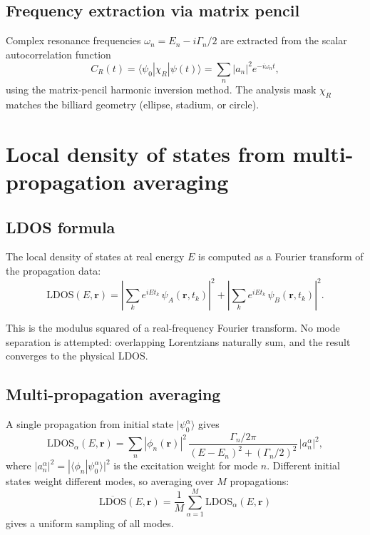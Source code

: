 \documentclass[11pt,a4paper]{article}
\newcommand{\vb}[1]{\mathbf{#1}}
\begin{document}
\subsection{Frequency extraction via matrix pencil}

Complex resonance frequencies $\omega_n = E_n - i\Gamma_n/2$ are extracted from
the scalar autocorrelation function
\begin{equation}
  C_R(t) = \langle\psi_0|\chi_R|\psi(t)\rangle
         = \sum_n |a_n|^2 e^{-i\omega_n t},
\end{equation}
using the matrix-pencil harmonic inversion method.  The analysis mask $\chi_R$
matches the billiard geometry (ellipse, stadium, or circle).

\section{Local density of states from multi-propagation averaging}
\label{sec:ldos}

\subsection{LDOS formula}

The local density of states at real energy $E$ is computed as a
Fourier transform of the propagation data:
\begin{equation}
  \text{LDOS}(E, \vb{r}) =
  \left|\sum_k e^{iE t_k}\,\psi_A(\vb{r}, t_k)\right|^2
  + \left|\sum_k e^{iE t_k}\,\psi_B(\vb{r}, t_k)\right|^2.
  \label{eq:ldos}
\end{equation}

This is the modulus squared of a real-frequency Fourier transform.
No mode separation is attempted: overlapping Lorentzians naturally
sum, and the result converges to the physical LDOS.

\subsection{Multi-propagation averaging}

A single propagation from initial state $|\psi_0^\alpha\rangle$ gives
\begin{equation}
  \text{LDOS}_\alpha(E, \vb{r}) =
  \sum_n |\phi_n(\vb{r})|^2\,
  \frac{\Gamma_n/2\pi}{(E-E_n)^2 + (\Gamma_n/2)^2}\,|a_n^\alpha|^2,
\end{equation}
where $|a_n^\alpha|^2 = |\langle\phi_n|\psi_0^\alpha\rangle|^2$ is the
excitation weight for mode $n$.  Different initial states weight
different modes, so averaging over $M$ propagations:
\begin{equation}
  \overline{\text{LDOS}}(E,\vb{r}) = \frac{1}{M}\sum_{\alpha=1}^M
  \text{LDOS}_\alpha(E,\vb{r})
\end{equation}
gives a uniform sampling of all modes.
\end{document}
